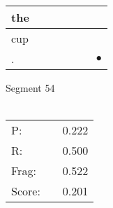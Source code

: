\documentclass[landscape]{article}
\newcommand{\ssp}{\hspace{2pt}}
\newcommand{\mex}{\cellcolor{g}$\bullet$}
\begin{document}
\begin{tabular}{|l|p{10pt}|p{10pt}|p{10pt}|p{10pt}|p{10pt}|p{10pt}|}
\hline
\ssp the \ssp&\hspace{2pt}&\hspace{2pt}&\hspace{2pt}&\hspace{2pt}&\hspace{2pt}&\hspace{2pt}\\
\hline
\ssp cup \ssp&\hspace{2pt}&\hspace{2pt}&\hspace{2pt}&\hspace{2pt}&\hspace{2pt}&\hspace{2pt}\\
\hline
\ssp \cellcolor{ref5}. \ssp&\hspace{2pt}&\hspace{2pt}&\hspace{2pt}&\hspace{2pt}&\hspace{2pt}&\hspace{2pt}\mex\\
\hline
\end{tabular}

\vspace{6pt}
\noindent Segment 54\\\\
\noindent\begin{tabular}{lm{12pt}r}
\hline
P:&&0.222\\
R:&&0.500\\
Frag:&&0.522\\
Score:&&0.201\\
\end{tabular}

\newpage
\end{document}

